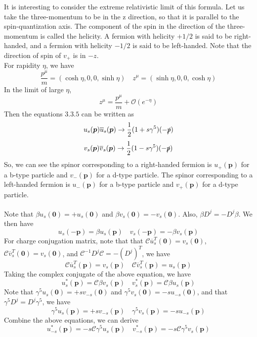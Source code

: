 \noindent
It is interesting to consider the extreme relativistic limit of this formula. Let us take the three-momentum to be in the z direction, so that it is parallel to the spin-quantization axis. The component of the spin in the direction of the three-momentum is called the helicity. A fermion with helicity $+1/2$ is said to be right-handed, and a fermion with helicity $-1/2$ is said to be left-handed. Note that the direction of spin of $v_+$ is in $-z$.\\  
For rapidity $\eta$, we have
\[\frac{p^{\mu}}{m} = (\cosh \eta, 0, 0, \sinh \eta) \quad z^{\mu} = (\sinh \eta, 0, 0, \cosh \eta)\]
In the limit of large $\eta$,
\[z^{\mu} = \frac{p^{\mu}}{m} + \mathcal{O}(e^{-\eta})\]
Then the equations $3.3.5$ can be written as
\[u_s(\bm{p}) \overline{u}_s(\bm{p})  \to \frac{1}{2}(1+s\gamma^5)(-\slashed{p})\]
\[v_s(\bm{p}) \overline{v}_s(\bm{p})  \to \frac{1}{2}(1-s\gamma^5)(-\slashed{p})\]
So, we can see the spinor corresponding to a right-handed fermion  is $u_+(\bm{p})$ for a b-type particle and $v_-({\bm{p}})$ for a d-type particle.  The spinor corresponding to a left-handed fermion  is $u_-(\bm{p})$ for a b-type particle and $v_+(\bm{p})$ for a d-type particle.\\ \\
Note that $\beta u_s(\bm{0}) = + u_s(\bm{0})$ and $\beta v_s(\bm{0}) = -v_s(\bm{0})$. Also, $\beta D^j = - D^j \beta$. We then have
\[u_s(-\bm{p}) = \beta u_s(\bm{p}) \quad v_s(-\bm{p}) = -\beta v_s(\bm{p})\]
For charge conjugation matrix, note that that $\mathcal{C} \overline{u}^T_s(\bm{0}) = v_s(\bm{0})$, $\mathcal{C} \overline{v}^T_s(\bm{0}) = v_s(\bm{0})$, and $\mathcal{C}^{-1} D^j \mathcal{C} = - (D^j)^T$, we have
\[\mathcal{C} \overline{u}^T_s(\bm{p}) = v_s(\bm{p}) \quad \mathcal{C} \overline{v}^T_s(\bm{p}) = u_s(\bm{p})\]
Taking the complex conjugate of the above equation, we have
\[u^*_s(\bm{p}) = \mathcal{C}\beta v_s(\bm{p}) \quad v^*_s(\bm{p}) = \mathcal{C}\beta u_s(\bm{p})\]
Note that $\gamma^5 u_{s}(\bm{0}) = +s v_{-s}(\bm{0})$ and $\gamma^5 v_{s}(\bm{0}) = -s u_{-s}(\bm{0})$, and that $\gamma^5 D^j = D^j \gamma^5$, we have
\[\gamma^5 u_{s}(\bm{p}) = +s v_{-s}(\bm{p}) \quad \gamma^5 v_{s}(\bm{p}) = -s u_{-s}(\bm{p})\]
Combine the above equations, we can derive
\[u^*_{-s}(\bm{p}) = -s\mathcal{C}\gamma^5 u_s(\bm{p}) \quad v^*_{-s}(\bm{p}) = -s\mathcal{C}\gamma^5 v_s(\bm{p})\]

